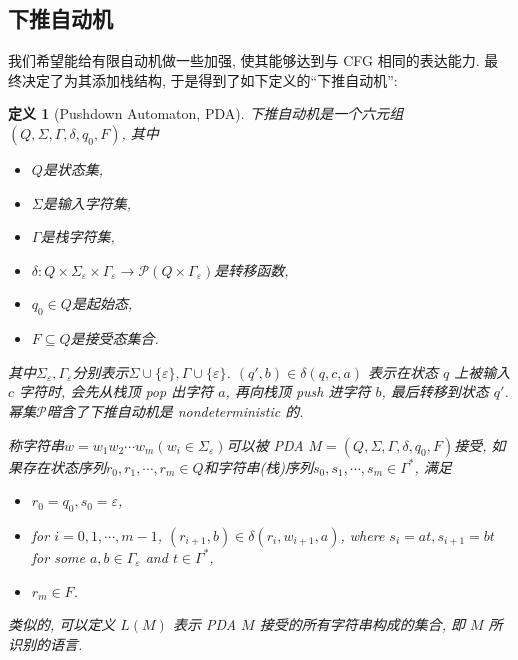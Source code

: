 \documentclass[8pt]{article}
\theoremstyle{compact}
\newtheorem{definition}[theorem]{定义}
\begin{document}
\subsection{下推自动机}

我们希望能给有限自动机做一些加强, 使其能够达到与 CFG 相同的表达能力. 最终决定了为其添加栈结构, 于是得到了如下定义的“下推自动机”:

\begin{definition}[Pushdown Automaton, PDA]
	下推自动机是一个六元组$(Q, \Sigma, \Gamma, \delta, q_0, F)$, 其中
	\begin{itemize}
		\item $Q$是状态集, 
		\item $\Sigma$是输入字符集, 
		\item $\Gamma$是栈字符集, 
		\item $\delta: Q \times \Sigma_{\varepsilon} \times \Gamma_{\varepsilon} \to \mathcal P(Q \times \Gamma_{\varepsilon})$是转移函数, 
		\item $q_0 \in Q$是起始态, 
		\item $F \subseteq Q$是接受态集合. 
	\end{itemize}

	其中$\Sigma_{\varepsilon}, \Gamma_{\varepsilon}$分别表示$\Sigma \cup \{\varepsilon\}, \Gamma \cup \{\varepsilon\}$. $(q', b) \in \delta(q, c, a)$ 表示在状态 $q$ 上被输入 $c$ 字符时, 会先从栈顶 pop 出字符 $a$, 再向栈顶 push 进字符 $b$, 最后转移到状态 $q'$. 幂集$\mathcal P$暗含了下推自动机是 nondeterministic 的. 

	称字符串$w = w_1w_2\cdots w_m(w_i \in \Sigma_{\varepsilon})$可以被 PDA $M = (Q, \Sigma, \Gamma, \delta, q_0, F)$接受, 如果存在状态序列$r_0, r_1, \cdots, r_m \in Q$和字符串(栈)序列$s_0, s_1, \cdots, s_m \in \Gamma^*$, 满足
	\begin{itemize}
		\item $r_0 = q_0, s_0 = \varepsilon$,
		\item for $i = 0, 1, \cdots, m-1$, $(r_{i+1}, b) \in \delta(r_i, w_{i+1}, a)$, where $s_i = at, s_{i+1}=bt$ for some $a, b \in \Gamma_{\varepsilon}$ and $t \in \Gamma^*$,
		\item $r_m \in F$.
	\end{itemize}

	类似的, 可以定义 $L(M)$ 表示 PDA $M$ 接受的所有字符串构成的集合, 即 $M$ 所识别的语言.
\end{definition}
\end{document}
